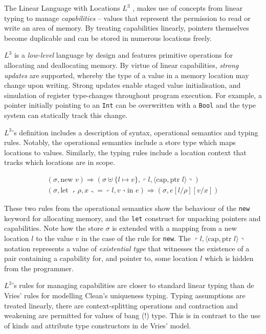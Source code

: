 \documentclass[]{unswthesis}
\newcommand{\lquine}{\left\ulcorner}
\newcommand{\rquine}{\right\urcorner}
\newcommand{\capa}{\text{cap}}
\newcommand{\ptr}{\text{ptr }}
\let\c\texttt
\let\i\textit
\begin{document}
The Linear Language with Locations $L^3$ \cite{ahmed05}, makes use of concepts from linear typing to manage \i{capabilities} -- values that represent the permission to read or write an area of memory. By treating capabilities linearly, pointers themselves become duplicable and can be stored in numerous locations freely.

$L^3$ is a \i{low-level} language by design and features primitive operations for allocating and deallocating memory. By virtue of linear capabilities, \i{strong updates} are supported, whereby the type of a value in a memory location may change upon writing. Strong updates enable staged value initialisation, and simulation of register type-changes throughout program execution. For example, a pointer initially pointing to an \c{Int} can be overwritten with a \c{Bool} and the type system can statically track this change.

$L^3$'s definition includes a description of syntax, operational semantics and typing rules. Notably, the operational semantics include a store type which maps locations to values. Similarly, the typing rules include a location context that tracks which locations are in scope.

\begin{eqnarray*}
(\sigma, \text{new } v) \Rightarrow (\sigma \uplus \{l \mapsto v\},
	\lquine l, \langle \capa, \ptr l \rangle \rquine)
\\
(\sigma, \text{let } \lquine \rho, x \rquine = \lquine l, v \rquine \text{in } e)
	\Rightarrow
	(\sigma, e[l/\rho][v/x])
\end{eqnarray*}

These two rules from the operational semantics show the behaviour of the \c{new} keyword for allocating memory, and the \c{let} construct for unpacking pointers and capabilities. Note how the store $\sigma$ is extended with a mapping from a new location $l$ to the value $v$ in the case of the rule for \c{new}. The $\lquine l, \langle \capa, \ptr l \rangle \rquine$ notation represents a value of \i{existential type} that witnesses the existence of a pair containing a capability for, and pointer to, some location $l$ which is hidden from the programmer.

$L^3$'s rules for managing capabilities are closer to standard linear typing than de Vries' rules for modelling Clean's uniqueness typing. Typing assumptions are treated linearly, there are context-splitting operations and contraction and weakening are permitted for values of bang (!) type. This is in contrast to the use of kinds and attribute type constructors in de Vries' model.
\end{document}
